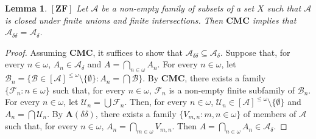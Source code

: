 \documentclass[12pt,twoside,leqno]{article}
\theoremstyle{plain}
\newtheorem{lemma}[theorem]{Lemma}
\theoremstyle{definition}
\theoremstyle{remark}
\begin{document}
\begin{lemma}
	\label{s6:l4}
	$[\mathbf{ZF}]$
	Let $\mathcal{A}$ be a non-empty family of subsets of a set $X$ such that $\mathcal{A}$ is closed under finite unions and finite intersections. Then $\mathbf{CMC}$ implies that $\mathcal{A}_{\delta\delta}=\mathcal{A}_{\delta}$. 
\end{lemma}
\begin{proof}
	Assuming $\mathbf{CMC}$, it suffices to show that $\mathcal{A}_{\delta\delta}\subseteq\mathcal{A}_{\delta}$. Suppose that, for every $n\in\omega$, $A_n\in\mathcal{A}_{\delta}$ and $A=\bigcap\limits_{n\in\omega}A_n$. For every $n\in\omega$, let $\mathcal{B}_n=\{ \mathcal{B}\in [\mathcal{A}]^{\leq\omega}\setminus\{\emptyset\}: A_n=\bigcap\mathcal{B}\}$. By $\mathbf{CMC}$, there exists a family $\{\mathcal{F}_n: n\in\omega\}$ such that, for every $n\in\omega$, $\mathcal{F}_n$ is a non-empty finite subfamily of $\mathcal{B}_n$. For every $n\in\omega$, let $\mathcal{U}_n=\bigcup\mathcal{F}_n$. Then, for every $n\in\omega$, $\mathcal{U}_n\in [\mathcal{A}]^{\leq\omega}\setminus\{\emptyset\}$ and $A_n=\bigcap\mathcal{U}_n$. By $\mathbf{A}(\delta\delta)$, there exists a family $\{V_{m,n}: m,n\in\omega\}$ of members of $\mathcal{A}$ such that, for every $n\in\omega$, $A_n=\bigcap\limits_{m\in\omega}V_{m,n}$. Then $A=\bigcap\limits_{n\in\omega}A_n\in \mathcal{A}_{\delta}$.
\end{proof}
\end{document}
